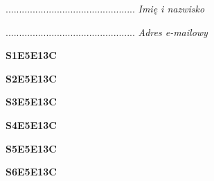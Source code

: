 \begin{turn}{90}\begin{minipage}{\linewidth} \vspace{20mm} ................................................  \textit{Imię i nazwisko}\end{minipage}\end{turn}

\begin{turn}{90}\begin{minipage}{\linewidth} \vspace{20mm} ................................................  \textit{Adres e-mailowy}\end{minipage}\end{turn}

\begin{turn}{90}\huge \begin{minipage}{\linewidth} \vspace{10mm}\textbf{S1E5E13C}\end{minipage}\end{turn}

\begin{turn}{90}\huge \begin{minipage}{\linewidth} \vspace{10mm}\textbf{S2E5E13C}\end{minipage}\end{turn}

\begin{turn}{90}\huge \begin{minipage}{\linewidth} \vspace{10mm}\textbf{S3E5E13C}\end{minipage}\end{turn}

\begin{turn}{90}\huge \begin{minipage}{\linewidth} \vspace{10mm}\textbf{S4E5E13C}\end{minipage}\end{turn}

\begin{turn}{90}\huge \begin{minipage}{\linewidth} \vspace{10mm}\textbf{S5E5E13C}\end{minipage}\end{turn}

\begin{turn}{90}\huge \begin{minipage}{\linewidth} \vspace{10mm}\textbf{S6E5E13C}\end{minipage}\end{turn}

